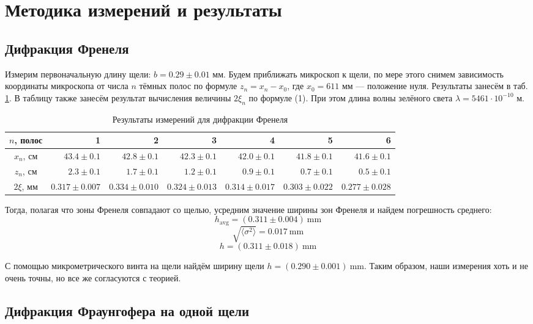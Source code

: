 \documentclass[12pt, a4paper]{article}
\newcommand{\mim}{~\mathrm{mm}}
\begin{document}
\section{Методика измерений и результаты}
\subsection{Дифракция Френеля}

Измерим первоначальную длину щели: $ b = 0.29 \pm 0.01$ мм.
Будем приближать микроскоп к щели, по мере этого снимем зависимость координаты
микроскопа от числа $ n  $ тёмных полос по формуле $ z_n = x_n - x_0 $, где $ x_0 = 611 $
мм --- положение нуля. Результаты занесём в таб. \ref{tab:fresnel}.
В таблицу также занесём результат вычисления величины $ 2\xi_n $ по формуле (1).
При этом длина волны зелёного света $ \lambda = 5461 \cdot 10^{-10} $ м.

\begin{table}[H]
  \begin{tabular}{|c|r|r|r|r|r|r|}
    \hline
    $n$, полос & 1                 & 2                  & 3                   & 4                   & 5                  & 6                   \\ \hline
    $x_n$, см  & $ 43.4\pm0.1$     & $ 42.8\pm0.1 $     & $ 42.3\pm0.1 $      & $ 42.0 \pm 0.1 $    & $ 41.8 \pm 0.1 $   & $ 41.6 \pm 0.1 $    \\ \hline
    $z_n$, см  & $ 2.3\pm0.1 $     & $ 1.7 \pm 0.1 $    & $ 1.2 \pm 0.1 $     & $ 0.9 \pm 0.1 $     & $ 0.7 \pm 0.1 $    & $ 0.5 \pm 0.1 $     \\ \hline
    $2\xi$, мм & $0.317 \pm 0.007$ & $ 0.334 \pm 0.010$ & $ 0.324 \pm 0.013 $ & $ 0.314 \pm 0.017 $ & $0.303 \pm 0.022 $ & $ 0.277 \pm 0.028 $ \\ \hline
  \end{tabular}
  \caption{Результаты измерений для дифракции Френеля}
  \label{tab:fresnel}
\end{table}

Тогда, полагая что зоны Френеля совпадают со щелью, усредним значение ширины зон Френеля и найдем погрешность среднего:
$$h_\text{avg} = (0.311 \pm 0.004) \mim$$
$$\sqrt{\langle\sigma^2\rangle} = 0.017\mim$$
$$ h = (0.311 \pm 0.018) \mim $$

С помощью  микрометрического винта на щели найдём ширину щели
$h = (0.290 \pm 0.001) \mim$. Таким образом, наши измерения хоть и не очень точны, но все же согласуются с теорией.

\subsection{Дифракция Фраунгофера на одной щели}
\end{document}
